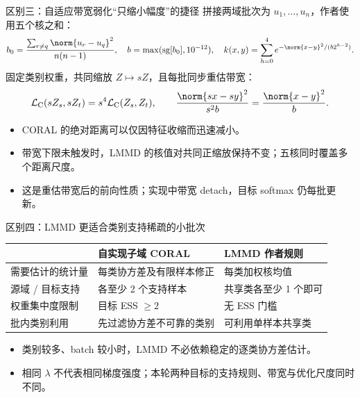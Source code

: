 \begin{frame}[t]{区别三：自适应带宽弱化“只缩小幅度”的捷径}
\small
拼接两域批次为 $u_1,\ldots,u_n$，作者使用五个核之和：
\[
b_0=\frac{\sum_{r\ne q}\norm{u_r-u_q}^2}{n(n-1)},\quad b=\max(\sg[b_0],10^{-12}),\quad
k(x,y)=\sum_{h=0}^{4}e^{-\norm{x-y}^2/(b2^{h-2})}.
\]
固定类别权重，共同缩放 $Z\mapsto sZ$，且每批同步重估带宽：
\[
\LC(sZ_s,sZ_t)=s^4\LC(Z_s,Z_t),\qquad
\frac{\norm{sx-sy}^2}{s^2b}=\frac{\norm{x-y}^2}{b}.
\]
\begin{itemize}
  \item CORAL 的绝对距离可以仅因特征收缩而迅速减小。
  \item 带宽下限未触发时，LMMD 的核值对共同正缩放保持不变；五核同时覆盖多个距离尺度。
  \item 这是重估带宽后的前向性质；实现中带宽 detach，目标 softmax 仍每批更新。
\end{itemize}
\end{frame}

\begin{frame}[t]{区别四：LMMD 更适合类别支持稀疏的小批次}
\small
\begin{tabularx}{\linewidth}{@{}P{28mm}YY@{}}
\toprule
 & 自实现子域 CORAL & LMMD 作者规则 \\
\midrule
需要估计的统计量 & 每类协方差及有限样本修正 & 每类加权核均值 \\
源域 / 目标支持 & 各至少 2 个支持样本 & 共享类各至少 1 个即可 \\
权重集中度限制 & 目标 ESS $\ge2$ & 无 ESS 门槛 \\
批内类别利用 & 先过滤协方差不可靠的类别 & 可利用单样本共享类 \\
\bottomrule
\end{tabularx}
\vspace{3mm}
\begin{itemize}
  \item 类别较多、batch 较小时，LMMD 不必依赖稳定的逐类协方差估计。
  \item 相同 $\lambda$ 不代表相同梯度强度；本轮两种目标的支持规则、带宽与优化尺度同时不同。
\end{itemize}
\end{frame}

